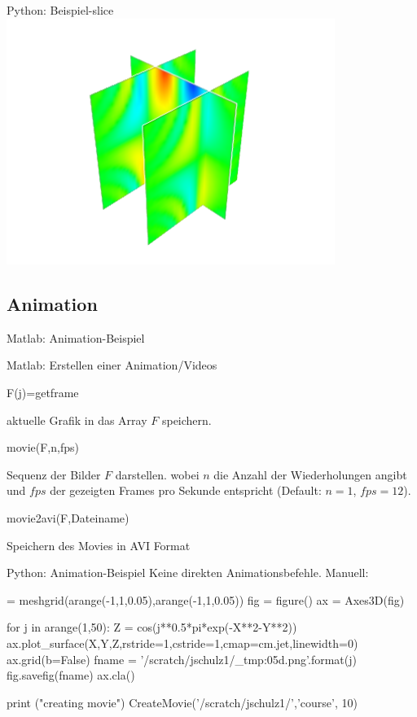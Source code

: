 \documentclass[hyperref={xetex}]{beamer}
\begin{document}
\begin{frame}[fragile]{Python: Beispiel-slice}
\hfil\includegraphics[width=0.8\textwidth]{figures/pyslice}\hfil
\end{frame}

\subsection{Animation}
% 
% 
\begin{frame}[fragile]{Matlab: Animation-Beispiel}
\end{frame}
%
% 
\begin{frame}[fragile]{Matlab: Erstellen einer Animation/Videos}
  \begin{matlabin}
F(j)=getframe
  \end{matlabin}
aktuelle Grafik in das Array $F$ speichern.
  \begin{matlabin}
movie(F,n,fps)
  \end{matlabin}
Sequenz der Bilder $F$ darstellen. wobei $n$ die Anzahl der Wiederholungen angibt und $fps$ der
  gezeigten Frames pro Sekunde entspricht (Default: $n=1$, $fps=12$). 
  \begin{matlabin}
movie2avi(F,Dateiname)
  \end{matlabin}
Speichern des Movies in AVI Format
\end{frame}
% 
% 
\begin{frame}[fragile]{Python: Animation-Beispiel}
Keine direkten Animationsbefehle. Manuell:
  \begin{pyin}
[X,Y] = meshgrid(arange(-1,1,0.05),arange(-1,1,0.05))
fig = figure()
ax = Axes3D(fig)

for j in arange(1,50):
    Z = cos(j**0.5*pi*exp(-X**2-Y**2))
    ax.plot_surface(X,Y,Z,rstride=1,cstride=1,cmap=cm.jet,linewidth=0)
    ax.grid(b=False)
    fname = '/scratch/jschulz1/_tmp{:05d}.png'.format(j) 
    fig.savefig(fname)
    ax.cla()
    
print ("creating movie")
CreateMovie('/scratch/jschulz1/','course', 10)    
  \end{pyin}
\end{frame}

%
%
\end{document}

